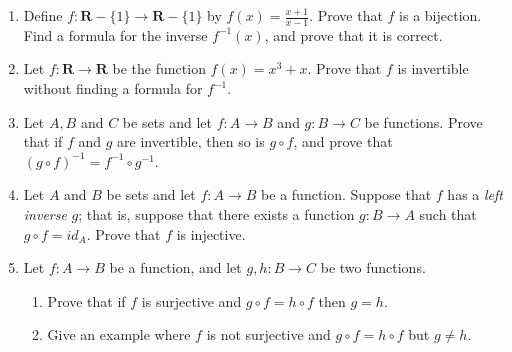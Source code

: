 \begin{enumerate}
\item Define $f \colon \mathbf{R}-\{1\} \to \mathbf{R} - \{1\}$ by $f(x) = \frac{x+1}{x-1}$. Prove that $f$ is a bijection. Find a formula for the inverse $f^{-1}(x)$, and prove that it is correct.
\item Let $f \colon \mathbf{R} \to \mathbf{R}$ be the function $f(x) = x^3 + x$. Prove that $f$ is invertible without finding a formula for $f^{-1}$.
\item Let $A, B$ and $C$ be sets and let $f \colon A \to B$ and $g \colon B \to C$ be functions. Prove that if $f$ and $g$ are invertible, then so is $g \circ f$, and prove that $(g \circ f)^{-1} = f^{-1} \circ g^{-1}$.
\item Let $A$ and $B$ be sets and let $f \colon A \to B$ be a function. Suppose that $f$ has a \emph{left inverse} $g$; that is, suppose that there exists a function $g \colon B \to A$ such that $g \circ f = id_A$. Prove that $f$ is injective.

  
\item Let $f \colon A \to B$ be a function, and let $g,h \colon B \to C$ be two functions. 
  \begin{enumerate}
  \item Prove that if $f$ is surjective and
    $g \circ f = h \circ f$ then $g = h$.
  \item Give an example where $f$ is not surjective and $g \circ f = h \circ f$ but $g \neq h$.
\end{enumerate}

\end{enumerate}

